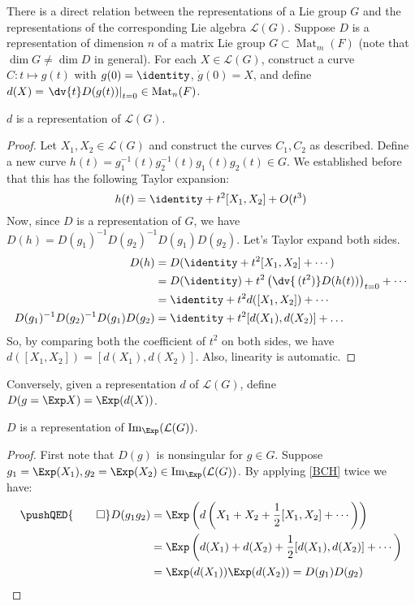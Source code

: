 \documentclass{jknotes}
\begin{document}
There is a direct relation between the representations of a Lie group \(G\) and the representations of the corresponding Lie algebra \(\mathcal{L}(G)\). Suppose \(D\) is a representation of dimension \(n\) of a matrix Lie group \(G \subset \operatorname{Mat}_m(F)\) (note that \(\dim G \ne \dim D\) in general). For each \(X \in \mathcal{L}(G)\), construct a curve \(C : t \mapsto g(t)\) with \(g(0) = \identity\), \(\dot{g}(0) = X\), and define \(d(X) = \left.\dv{t} D(g(t))\right|_{t=0} \in \operatorname{Mat}_n(F)\). 
\begin{lemma}
    \(d\) is a representation of \(\mathcal{L}(G)\).
\end{lemma}
\begin{proof}
    Let \(X_1,X_2 \in \mathcal{L}(G)\) and construct the curves \(C_1,C_2\) as described. Define a new curve \(h(t)=g_1^{-1}(t)g_2^{-1}(t)g_1(t)g_2(t) \in G\). We established before that this has the following Taylor expansion:
    \begin{equation}
        h(t) = \identity + t^2[X_1,X_2] + O(t^3)
    \end{equation}
    Now, since \(D\) is a representation of \(G\), we have \(D(h) = D(g_1)^{-1}D(g_2)^{-1}D(g_1)D(g_2)\). Let's Taylor expand both sides.
    \begin{align}
        D(h) &= D(\identity + t^2[X_1,X_2] + \cdots)\\
        &= D(\identity) + t^2 \left(\dv{\,(t^2)}D(h(t))\right)_{t=0} + \cdots\\
        &= \identity + t^2d([X_1,X_2]) + \cdots \\
        D(g_1)^{-1}D(g_2)^{-1}D(g_1)D(g_2) &= \identity + t^2[d(X_1),d(X_2)] + \dots
    \end{align}
    So, by comparing both the coefficient of \(t^2\) on both sides, we have \(d([X_1,X_2]) = [d(X_1),d(X_2)]\). Also, linearity is automatic.
\end{proof}
Conversely, given a representation \(d\) of \(\mathcal{L}(G)\), define \(D(g=\Exp X) = \Exp(d(X))\).
\begin{lemma}
    \(D\) is a representation of \(\operatorname{Im}_{\Exp} (\mathcal{L}(G))\).
\end{lemma}
\begin{unlectured}
    \begin{proof}
        First note that \(D(g)\) is nonsingular for \(g \in G\). Suppose \(g_1=\Exp(X_1), g_2=\Exp(X_2) \in \operatorname{Im}_{\Exp} (\mathcal{L}(G))\). By applying \eqref{BCH} twice we have:
        \begin{align}
            \pushQED{\qed}
            D(g_1g_2) &= \Exp\left(d\left(X_1+X_2 + \frac{1}{2}[X_1,X_2] + \cdots\right)\right) \\
            &= \Exp\left( d(X_1)+d(X_2) + \frac{1}{2}[d(X_1),d(X_2)] + \cdots \right) \\
            &= \Exp(d(X_1))\Exp(d(X_2)) = D(g_1)D(g_2)
            \qedhere
        \end{align}
    \end{proof}
\end{unlectured}
\end{document}
